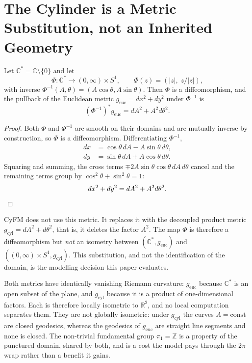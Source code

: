 \section{The Cylinder is a Metric Substitution, not an Inherited Geometry}
\label{sec:app_metric_choice}

\begin{lemma}
\label{lem:chart_pullback}
Let $\mathbb{C}^* = \mathbb{C} \setminus \{0\}$ and let
\begin{equation}
    \Phi : \mathbb{C}^* \to (0, \infty) \times S^1, \qquad
    \Phi(z) = \left( |z|, \; z / |z| \right),
\end{equation}
with inverse $\Phi^{-1}(A, \theta) = (A\cos\theta, A\sin\theta)$. Then $\Phi$ is a diffeomorphism, and the pullback of the Euclidean metric $g_{\mathrm{euc}} = dx^2 + dy^2$ under $\Phi^{-1}$ is
\begin{equation}
    (\Phi^{-1})^* g_{\mathrm{euc}} = dA^2 + A^2 d\theta^2 .
\end{equation}
\end{lemma}
\begin{proof}
Both $\Phi$ and $\Phi^{-1}$ are smooth on their domains and are mutually inverse by construction, so $\Phi$ is a diffeomorphism. Differentiating $\Phi^{-1}$,
\begin{align}
    dx &= \cos\theta \, dA - A \sin\theta \, d\theta, \\
    dy &= \sin\theta \, dA + A \cos\theta \, d\theta .
\end{align}
Squaring and summing, the cross terms $\mp 2A\sin\theta\cos\theta \, dA \, d\theta$ cancel and the remaining terms group by $\cos^2\theta + \sin^2\theta = 1$:
\begin{equation}
    dx^2 + dy^2 = dA^2 + A^2 d\theta^2 . \qedhere
\end{equation}
\end{proof}

CyFM does not use this metric. It replaces it with the decoupled product metric $g_{\mathrm{cyl}} = dA^2 + d\theta^2$, that is, it deletes the factor $A^2$. The map $\Phi$ is therefore a diffeomorphism but \emph{not} an isometry between $(\mathbb{C}^*, g_{\mathrm{euc}})$ and $((0,\infty) \times S^1, g_{\mathrm{cyl}})$. This substitution, and not the identification of the domain, is the modelling decision this paper evaluates.

\begin{remark}
\label{rem:both_flat}
Both metrics have identically vanishing Riemann curvature: $g_{\mathrm{euc}}$ because $\mathbb{C}^*$ is an open subset of the plane, and $g_{\mathrm{cyl}}$ because it is a product of one-dimensional factors. Each is therefore locally isometric to $\mathbb{R}^2$, and no local computation separates them. They are not globally isometric: under $g_{\mathrm{cyl}}$ the curves $A = \mathrm{const}$ are closed geodesics, whereas the geodesics of $g_{\mathrm{euc}}$ are straight line segments and none is closed. The non-trivial fundamental group $\pi_1 = \mathbb{Z}$ is a property of the punctured domain, shared by both, and is a cost the model pays through the $2\pi$ wrap rather than a benefit it gains.
\end{remark}

